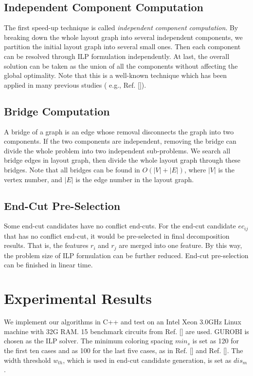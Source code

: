 \documentclass[12pt]{spieman}
\theoremstyle{plain}
\begin{document}
\begin{spacing}{1}
\subsection{Independent Component Computation}

The first speed-up technique is called \textit{independent component computation}.
By breaking down the whole layout graph into several independent components, we partition the initial layout graph into several small ones.
Then each component can be resolved through ILP formulation independently.
At last, the overall solution can be taken as the union of all the components without affecting the global optimality.
Note that this is a well-known technique which has been applied in many previous studies ( e.g., Ref. []).

\subsection{Bridge Computation}

A bridge of a graph is an edge whose removal disconnects the graph into two components.
If the two components are independent, removing the bridge can divide the whole problem into two independent sub-problems.
We search all bridge edges in layout graph, then divide the whole layout graph through these bridges.
Note that all bridges can be found in $O(|V|+|E|)$, where $|V|$ is the vertex number, and $|E|$ is the edge number in the layout graph.

\subsection{End-Cut Pre-Selection}

Some end-cut candidates have no conflict end-cuts.
For the end-cut candidate $ec_{ij}$ that has no conflict end-cut, it would be pre-selected in final decomposition results.
That is, the features $r_i$ and $r_j$ are merged into one feature.
By this way, the problem size of ILP formulation can be further reduced.
End-cut pre-selection can be finished in linear time.


\section{Experimental Results}
\label{sec:tplec_result}


We implement our algorithms in C++ and test on an Intel Xeon 3.0GHz Linux machine with 32G RAM.
15 benchmark circuits from Ref. [] are used.
GUROBI \cite{Gurobi} is chosen as the ILP solver.
The minimum coloring spacing $min_s$ is set as 120 for the first ten cases and as 100 for the last five cases,
as in Ref. [] and Ref. [].
The width threshold $w_{th}$, which is used in end-cut candidate generation, is set as $dis_m$.



\end{spacing}
\end{document}

